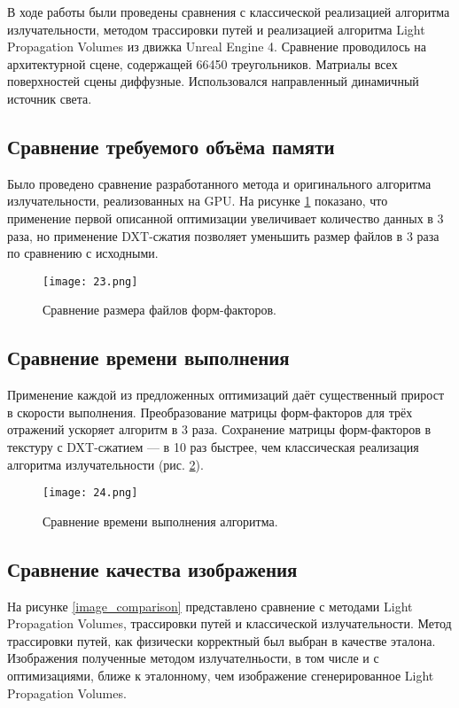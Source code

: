 \documentclass[12pt,fleqn]{article}
\begin{document}
В ходе работы были проведены сравнения с классической реализацией алгоритма излучательности, методом трассировки путей и реализацией алгоритма Light Propagation Volumes из движка Unreal Engine 4. Сравнение проводилось на архитектурной сцене, содержащей 66450 треугольников. Матриалы всех поверхностей сцены диффузные. Использовался направленный динамичный источник света.

\subsection{Сравнение требуемого объёма памяти}

Было проведено сравнение разработанного метода и оригинального алгоритма излучательности, реализованных на GPU. На рисунке \ref{size_comparison} показано, что применение первой описанной оптимизации увеличивает количество данных в 3 раза, но применение DXT-сжатия позволяет уменьшить размер файлов в 3 раза по сравнению с исходными.

\begin{figure}[htb]
    \centering
    \texttt{[image: 23.png]}
    \caption{Сравнение размера файлов форм-факторов.}
    \label{size_comparison}
\end{figure}

\subsection{Сравнение времени выполнения}

Применение каждой из предложенных оптимизаций даёт существенный прирост в скорости выполнения. Преобразование матрицы форм-факторов для трёх отражений ускоряет алгоритм в 3 раза. Сохранение матрицы форм-факторов в текстуру с DXT-сжатием --- в 10 раз быстрее, чем классическая реализация алгоритма излучательности (рис. \ref{speed_comparison}).

\begin{figure}[htb]
    \centering
    \texttt{[image: 24.png]}
    \caption{Сравнение времени выполнения алгоритма.}
    \label{speed_comparison}
\end{figure}


\subsection{Сравнение качества изображения}

На рисунке \ref{image_comparison} представлено сравнение с методами Light Propagation Volumes, трассировки путей и классической излучательности. Метод трассировки путей, как физически корректный был выбран в качестве эталона. Изображения полученные методом излучателньости, в том числе и с оптимизациями, ближе к эталонному, чем изображение сгенерированное Light Propagation Volumes. 
\end{document}
